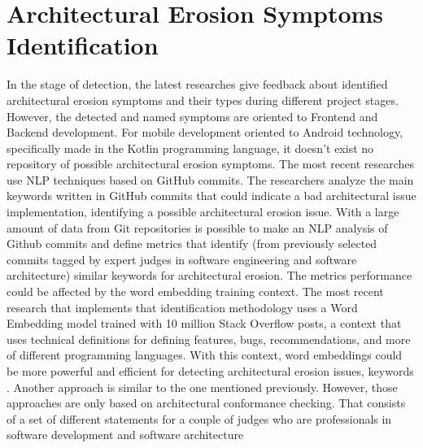 \section{Architectural Erosion Symptoms Identification}
In the stage of detection, the latest researches give feedback about identified architectural erosion symptoms and their types during different project stages. However, the detected and named symptoms are oriented to Frontend and Backend development. For mobile development oriented to Android technology, specifically made in the Kotlin programming language, it doesn't exist no repository of possible architectural erosion symptoms. The most recent researches use NLP techniques based on GitHub commits. The researchers analyze the main keywords written in GitHub commits that could indicate a bad architectural issue implementation, identifying a possible architectural erosion issue.
With a large amount of data from Git repositories is possible to make an NLP analysis of Github commits and define metrics that identify (from previously selected commits tagged by expert judges in software engineering and software architecture) similar keywords for architectural erosion. The metrics performance could be affected by the word embedding training context. The most recent research that implements that identification methodology uses a Word Embedding model trained with 10 million Stack Overflow posts, a context that uses technical definitions for defining features, bugs, recommendations, and more of different programming languages. With this context, word embeddings could be more powerful and efficient for detecting architectural erosion issues, keywords \cite{warnings-architectural-erosion,so-word-embedding}.
Another approach is similar to the one mentioned previously. However, those approaches are only based on architectural conformance checking. That consists of a set of different statements for a couple of judges who are professionals in software development and software architecture


